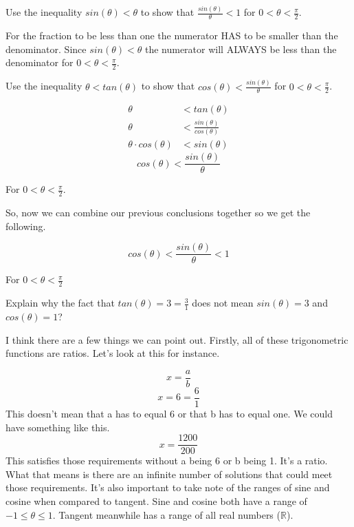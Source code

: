 \documentclass[10pt,letterpaper]{amspset}
\begin{document}
\pagebreak


\begin{problem}[e]
Use the inequality $sin(\theta) < \theta$ to show that $\frac{sin(\theta)}{\theta} < 1$ for $0 < \theta < \frac{\pi}{2}$.
\end{problem}

\begin{solution}
For the fraction to be less than one the numerator HAS to be smaller than the denominator. Since $sin(\theta) < \theta$ the numerator will ALWAYS be less than the denominator for $0 < \theta < \frac{\pi}{2}$.
\end{solution}


\begin{problem}[f]
Use the inequality $\theta < tan(\theta)$ to show that $cos(\theta) < \frac{sin(\theta)}{\theta}$ for $0 < \theta < \frac{\pi}{2}$.
\end{problem}

\begin{solution}
\begin{align}
    \theta &< tan(\theta) \\
    \theta &< \frac{sin(\theta)}{cos(\theta)} \\
    \theta \cdot cos(\theta) &< sin(\theta)
\end{align}
\[\boxed{cos(\theta) < \frac{sin(\theta)}{\theta}}\]
\begin{center}
    For $0 < \theta < \frac{\pi}{2}$.
\end{center}

So, now we can combine our previous conclusions together so we get the following.

\[\boxed{cos(\theta) < \frac{sin(\theta)}{\theta} < 1}\]
\begin{center}
    For $0 < \theta < \frac{\pi}{2}$
\end{center}
\end{solution}

\pagebreak


\begin{problem}[137]
Explain why the fact that $tan(\theta) = 3 = \frac{3}{1}$ does not mean $sin(\theta) = 3$ and $cos(\theta) = 1$?
\end{problem}

\begin{solution}
I think there are a few things we can point out. Firstly, all of these trigonometric functions are ratios. Let's look at this for instance.

\[x = \frac{a}{b}\]
\[x = 6 = \frac{6}{1}\]
This doesn't mean that a has to equal 6 or that b has to equal one. We could have something like this.
\[x = \frac{1200}{200}\]
This satisfies those requirements without a being 6 or b being 1. It's a ratio. What that means is there are an infinite number of solutions that could meet those requirements. It's also important to take note of the ranges of sine and cosine when compared to tangent. Sine and cosine both have a range of $-1 \leq \theta \leq 1$. Tangent meanwhile has a range of all real numbers ($\mathbb{R}$).

\end{solution}
\end{document}
